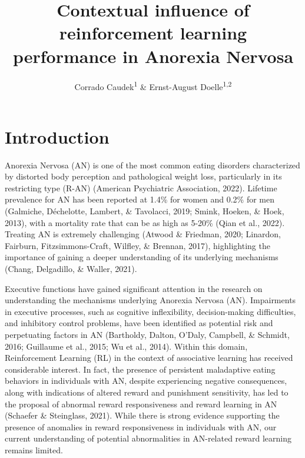 \documentclass[
  man,floatsintext]{apa6}
\title{Contextual influence of reinforcement learning performance in Anorexia Nervosa}
\author{Corrado Caudek\textsuperscript{1} \& Ernst-August Doelle\textsuperscript{1,2}}
\date{}
\affiliation{\vspace{0.5cm}\textsuperscript{1} Wilhelm-Wundt-University\\\textsuperscript{2} Konstanz Business School}
\begin{document}
\maketitle

\hypertarget{introduction}{%
\section{Introduction}\label{introduction}}

Anorexia Nervosa (AN) is one of the most common eating disorders characterized by distorted body perception and pathological weight loss, particularly in its restricting type (R-AN) (American Psychiatric Association, 2022). Lifetime prevalence for AN has been reported at 1.4\% for women and 0.2\% for men (Galmiche, Déchelotte, Lambert, \& Tavolacci, 2019; Smink, Hoeken, \& Hoek, 2013), with a mortality rate that can be as high as 5-20\% (Qian et al., 2022). Treating AN is extremely challenging (Atwood \& Friedman, 2020; Linardon, Fairburn, Fitzsimmons-Craft, Wilfley, \& Brennan, 2017), highlighting the importance of gaining a deeper understanding of its underlying mechanisms (Chang, Delgadillo, \& Waller, 2021).

Executive functions have gained significant attention in the research on understanding the mechanisms underlying Anorexia Nervosa (AN). Impairments in executive processes, such as cognitive inflexibility, decision-making difficulties, and inhibitory control problems, have been identified as potential risk and perpetuating factors in AN (Bartholdy, Dalton, O'Daly, Campbell, \& Schmidt, 2016; Guillaume et al., 2015; Wu et al., 2014). Within this domain, Reinforcement Learning (RL) in the context of associative learning has received considerable interest. In fact, the presence of persistent maladaptive eating behaviors in individuals with AN, despite experiencing negative consequences, along with indications of altered reward and punishment sensitivity, has led to the proposal of abnormal reward responsiveness and reward learning in AN (Schaefer \& Steinglass, 2021). While there is strong evidence supporting the presence of anomalies in reward responsiveness in individuals with AN, our current understanding of potential abnormalities in AN-related reward learning remains limited.
\end{document}
